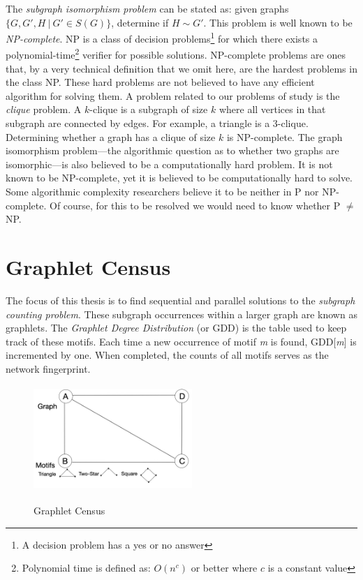 \documentclass[12pt,twoside]{reedthesis}
\begin{document}
The \textit{subgraph isomorphism problem} can be stated as: given graphs $\{G, G', H \ | \  G' \in S(G) \}$, determine if $H \sim G'$. This problem is well known to be \textit{NP-complete}. NP is a class of decision problems\footnote{A decision problem has a yes or no answer} for which there exists a polynomial-time\footnote{Polynomial time is defined as: $O(n^c)$ or better where $c$ is a constant value} verifier for possible solutions. NP-complete problems are ones that, by a very technical definition that we omit here, are the hardest problems in the class NP. These hard problems are not believed to have any efficient algorithm for solving them. A problem related to our problems of study is the \textit{clique} problem. A $k$-clique is a subgraph of size $k$ where all vertices in that subgraph are connected by edges. For example, a triangle is a 3-clique. Determining whether a graph has a clique of size $k$ is NP-complete. The graph isomorphism problem---the algorithmic question as to whether two graphs are isomorphic---is also believed to be a computationally hard problem. It is not known to be NP-complete, yet it is believed to be computationally hard to solve. Some algorithmic complexity researchers believe it to be neither in P nor NP-complete. Of course, for this to be resolved we would need to know whether P $\neq$ NP.

\section{Graphlet Census} \label{sec:sub_cens}

The focus of this thesis is to find sequential and parallel solutions to the \textit{subgraph counting problem}. These subgraph occurrences within a larger graph are known as graphlets.  The \textit{Graphlet Degree Distribution} (or  {GDD}) is the table used to keep track of these motifs. Each time a new occurrence of motif \textit{m} is found, GDD[\textit{m}] is incremented by one. When completed, the counts of all motifs serves as the network fingerprint.

\begin{figure}[h]
	\caption{Graphlet Census}
	\centering
	\includegraphics[width=6cm, height=4cm]{simple_census}
	\label{fig:simple_census}
\end{figure}
\end{document}
